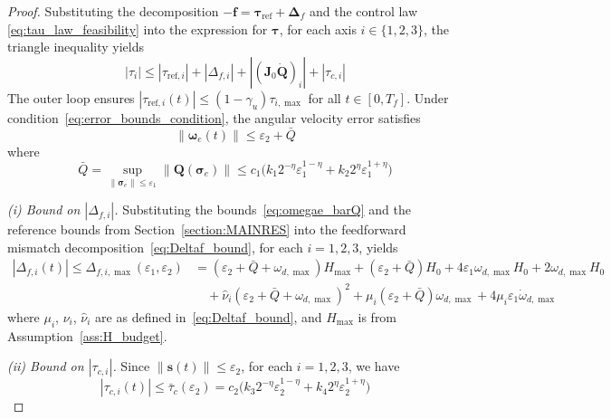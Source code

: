 \documentclass[journal]{new-aiaa}
\begin{document}
\begin{proof}
Substituting the decomposition $-\boldsymbol{f} = \boldsymbol{\tau}_{\mathrm{ref}} + \boldsymbol{\Delta}_f$
and the control law \eqref{eq:tau_law_feasibility} into the expression for $\boldsymbol{\tau}$, for each axis $i\in\{1,2,3\}$, the triangle inequality yields
\begin{equation}
|\tau_i| \le |\tau_{\mathrm{ref},i}| + |\Delta_{f,i}| + |(\boldsymbol{J}_0\dot{\boldsymbol{Q}})_i| + |\tau_{c,i}|
\label{eq:tau_axis_triangle}
\end{equation}
The outer loop ensures $|\tau_{\mathrm{ref},i}(t)|\le (1-\gamma_u)\tau_{i,\max}$ for all $t\in[0,T_f]$.
Under condition~\eqref{eq:error_bounds_condition}, the angular velocity error satisfies
\begin{equation}
\|\boldsymbol{\omega}_e(t)\| \le \varepsilon_2 + \bar Q
\label{eq:wemax}
\end{equation}
where
\begin{equation}
\bar Q = \sup_{\|\boldsymbol{\sigma}_e\|\le\varepsilon_1}\|\boldsymbol{Q}(\boldsymbol{\sigma}_e)\|
\le c_1\big(k_1 2^{-\eta}\varepsilon_1^{1-\eta} + k_2 2^{\eta}\varepsilon_1^{1+\eta}\big)
\label{eq:omegae_barQ}
\end{equation}

\emph{(i) Bound on $|\Delta_{f,i}|$.}
Substituting the bounds~\eqref{eq:omegae_barQ} and the reference bounds from Section~\ref{section:MAINRES}
into the feedforward mismatch decomposition~\eqref{eq:Deltaf_bound}, for each $i=1,2,3$, yields
\begin{align}
|\Delta_{f,i}(t)|\le \Delta_{f,i,\max}(\varepsilon_1,\varepsilon_2)
&= (\varepsilon_2+\bar Q+\omega_{d,\max})H_{\max}
+(\varepsilon_2+\bar Q)H_0
+4\varepsilon_1\omega_{d,\max}H_0
+2\omega_{d,\max}H_0 \nonumber \\
&\quad +\hat\nu_i(\varepsilon_2+\bar Q+\omega_{d,\max})^2
+\mu_i(\varepsilon_2+\bar Q)\omega_{d,\max}
+4\mu_i\varepsilon_1\dot\omega_{d,\max}
\label{eq:Deltaf_i_envelope_inproof}
\end{align}
where $\mu_i$, $\nu_i$, $\hat\nu_i$ are as defined in~\eqref{eq:Deltaf_bound},
and $H_{\max}$ is from Assumption~\ref{ass:H_budget}.

\emph{(ii) Bound on $|\tau_{c,i}|$.}
Since $\|\boldsymbol{s}(t)\|\le \varepsilon_2$, for each $i=1,2,3$, we have
\begin{equation}
|\tau_{c,i}(t)|
\le \bar\tau_c(\varepsilon_2) =
c_2\big(k_3 2^{-\eta}\varepsilon_2^{1-\eta} + k_4 2^{\eta}\varepsilon_2^{1+\eta}\big)
\label{eq:thm4_tauc_bar_compact2}
\end{equation}


\end{proof}
\end{document}

